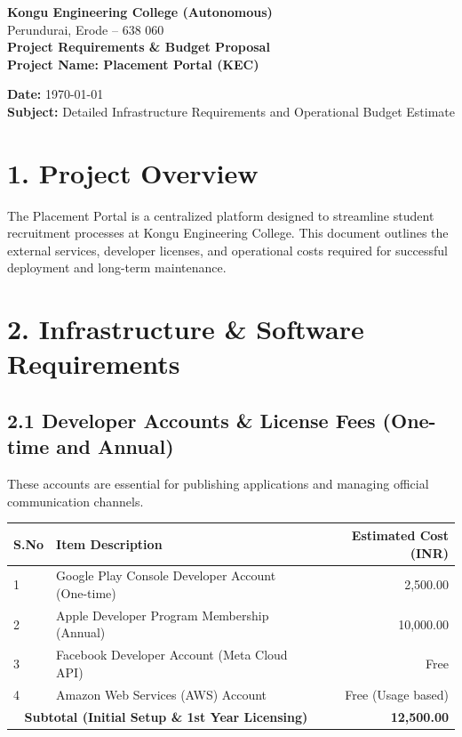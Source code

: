 \documentclass[12pt,a4paper]{article}
\begin{document}
\begin{center}
    {\LARGE \textbf{Kongu Engineering College (Autonomous)}} \\
    \vspace{0.2cm}
    {\large Perundurai, Erode -- 638 060} \\
    \vspace{0.8cm}
    {\Large \textbf{Project Requirements \& Budget Proposal}} \\
    \vspace{0.3cm}
    {\large \textbf{Project Name: Placement Portal (KEC)}} \\
\end{center}

\vspace{0.5cm}

\noindent \textbf{Date:} \today \\
\textbf{Subject:} Detailed Infrastructure Requirements and Operational Budget Estimate

\vspace{0.5cm}

\section*{1. Project Overview}
The Placement Portal is a centralized platform designed to streamline student recruitment processes at Kongu Engineering College. This document outlines the external services, developer licenses, and operational costs required for successful deployment and long-term maintenance.

\section*{2. Infrastructure \& Software Requirements}

\subsection*{2.1 Developer Accounts \& License Fees (One-time and Annual)}
These accounts are essential for publishing applications and managing official communication channels.

\vspace{0.3cm}
\noindent
\renewcommand{\arraystretch}{1.5}
\begin{tabular}{|l|p{8cm}|r|}
\hline
\textbf{S.No} & \textbf{Item Description} & \textbf{Estimated Cost (INR)} \\ \hline
1 & Google Play Console Developer Account (One-time) & 2,500.00 \\ \hline
2 & Apple Developer Program Membership (Annual) & 10,000.00 \\ \hline
3 & Facebook Developer Account (Meta Cloud API) & Free \\ \hline
4 & Amazon Web Services (AWS) Account & Free (Usage based) \\ \hline
\multicolumn{2}{|r|}{\textbf{Subtotal (Initial Setup \& 1st Year Licensing)}} & \textbf{12,500.00} \\ \hline
\end{tabular}
\vspace{0.5cm}
\end{document}

